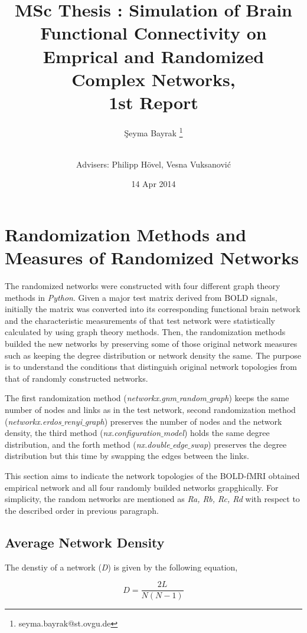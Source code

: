 \documentclass[12pt]{article}
\title{MSc Thesis : Simulation of Brain Functional Connectivity on Emprical and Randomized Complex Networks, \\ 1st Report}
\author[1]{\c{S}eyma Bayrak \thanks{seyma.bayrak@st.ovgu.de}}
\author[ ]{\\ Advisers: Philipp H\"{o}vel, Vesna Vuksanovi\'c}
\affil[1]{\footnotesize{Integrative Neuroscience MSc, Otto von Guericke University, Magdeburg}}
\date{14 Apr 2014}
\begin{document}
   \maketitle
   

	\section{Randomization Methods and Measures of Randomized Networks}	
	
The randomized networks were constructed with four different graph theory methods in  \textit{Python}. Given a major test matrix derived from BOLD signals, initially the matrix was converted into its corresponding functional brain network and the characteristic measurements of that test network were statistically calculated by using graph theory methods. Then, the randomization methods builded the new networks by preserving some of those original network measures such as keeping the degree distribution or network density the same. The purpose is to understand the conditions that distinguish original network topologies from that of randomly constructed networks.  

The first randomization method (\textit{networkx.gnm$\_$random$\_$graph}) keeps the same number of nodes and links as in the test network, second randomization method (\textit{networkx.erdos$\_$renyi$\_$graph}) preserves the number of nodes and the network density,  the third method (\textit{nx.configuration$\_$model}) holds the same degree distribution, and the forth method (\textit{nx.double$\_$edge$\_$swap}) preserves the degree distribution but this time by swapping the edges between the links. 
	
This section aims to indicate the network topologies of the BOLD-fMRI obtained empirical network and all four randomly builded networks grapghically. For simplicity, the random networks are mentioned as \textit{Ra, Rb, Rc, Rd} with respect to the described order in previous paragraph. 	
	
\subsection{Average Network Density}

The denstiy of a network (\textit{D}) is given by the following equation,

\begin{equation}
D = \frac{2L}{N(N-1)}
\end{equation}	
\end{document}
